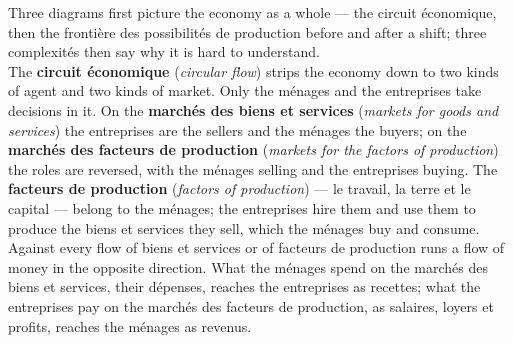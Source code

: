 Three diagrams first picture the economy as a whole --- the circuit économique,
then the frontière des possibilités de production before and after a shift; three
complexités then say why it is hard to understand.\\

The \textbf{circuit économique} (\textit{circular flow}) strips the economy down to
two kinds of agent and two kinds of market. Only the ménages and the entreprises
take decisions in it. On the \textbf{marchés des biens et services}
(\textit{markets for goods and services}) the entreprises are the sellers and the
ménages the buyers; on the \textbf{marchés des facteurs de production}
(\textit{markets for the factors of production}) the roles are reversed, with the
ménages selling and the entreprises buying. The \textbf{facteurs de production}
(\textit{factors of production}) --- le travail, la terre et le capital --- belong
to the ménages; the entreprises hire them and use them to produce the biens et
services they sell, which the ménages buy and consume.\\

Against every flow of biens et services or of facteurs de production runs a flow of
money in the opposite direction. What the ménages spend on the marchés des biens et
services, their dépenses, reaches the entreprises as recettes; what the entreprises
pay on the marchés des facteurs de production, as salaires, loyers et profits,
reaches the ménages as revenus.\\

